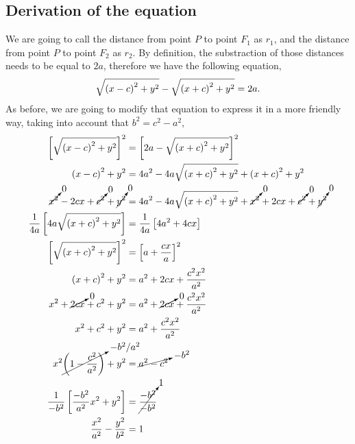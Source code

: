 \documentclass[../main-notes.tex]{subfiles}
\begin{document}
\subsection{Derivation of the equation}
We are going to call the distance from point $P$ to point $F_1$ as $r_1$, and the distance from point $P$ to point $F_2$ as $r_2$.
By definition, the substraction of those distances needs to be equal to $2a$, therefore we have the following equation,
\begin{gather*}
    \sqrt{\qty(x-c)^2+y^2} - \sqrt{\qty(x+c)^2+y^2} = 2a.
\end{gather*}
As before, we are going to modify that equation to express it in a more friendly way, taking into account that $b^2=c^2-a^2$,
\begin{align*}
    \left[\sqrt{\qty(x-c)^2+y^2}\right]^2 &= \left[2a - \sqrt{\qty(x+c)^2+y^2}\right]^2 \\
    \qty(x-c)^2+y^2 &= 4a^2 - 4a\sqrt{\qty(x+c)^2+y^2} + \qty(x+c)^2+y^2 \\
    \cancelto{0}{x^2} -2cx +\cancelto{0}{c^2} +\cancelto{0}{y^2} &= 4a^2 - 4a\sqrt{\qty(x+c)^2+y^2} + \cancelto{0}{x^2} + 2cx +\cancelto{0}{c^2} +\cancelto{0}{y^2} \\
    \frac{1}{4a}\left[4a\sqrt{\qty(x+c)^2+y^2}\right] &= \frac{1}{4a}\left[4a^2+4cx\right] \\
    \left[\sqrt{\qty(x+c)^2+y^2}\right]^2 &= \left[a+\frac{cx}{a}\right]^2 \\
    \qty(x+c)^2+y^2 &= a^2 + 2cx + \frac{c^2x^2}{a^2} \\
    x^2 + \cancelto{0}{2cx} + c^2 +y^2 &= a^2 + \cancelto{0}{2cx} + \frac{c^2x^2}{a^2} \\
    x^2 + c^2 +y^2 &= a^2 + \frac{c^2x^2}{a^2} \\
    x^2\cancelto{-b^2/a^2}{\qty(1-\frac{c^2}{a^2})} +y^2 &= \cancelto{-b^2}{a^2 - c^2} \\
    \frac{1}{-b^2}\left[\frac{-b^2}{a^2}x^2 +y^2\right] &= \cancelto{1}{\frac{-b^2}{-b^2}} \\
    \frac{x^2}{a^2} - \frac{y^2}{b^2} &= 1 \\
\end{align*}
\end{document}
